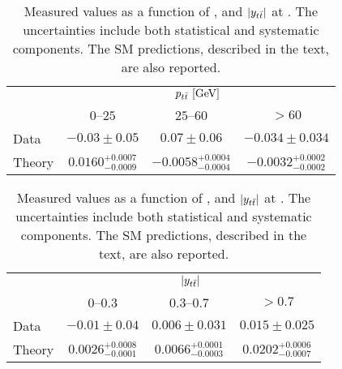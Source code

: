 \begin{table}[!htp]\centering
{}
\begin{tabular}{l c c c }
  &\multicolumn{3}{c}{$p_{t\bar{t}}{}~[\rm{GeV}]$}    \\
  \ac{} &     $0$--$25$           &        $25$--$60$         &  $>60$            \\
  \midrule
  Data  &    $-0.03\pm0.05$       &     $0.07\pm0.06$       &      $-0.034\pm0.034$     \\
  Theory & $0.0160^{+0.0007}_{-0.0009}$ & $-0.0058^{+0.0004}_{-0.0004}$ & $-0.0032^{+0.0002}_{-0.0002}$  \\
  \bottomrule
\end{tabular}
\begin{tabular}{l c c c }
  &\multicolumn{3}{c}{$|y_{t\bar{t}}{}|$}    \\
  \ac{}  &     $0$--$0.3$          &        $0.3$--$0.7$     &  $>0.7$            \\
  \midrule
  Data  &    $-0.01\pm0.04$       &     $0.006\pm0.031$     &      $0.015\pm0.025$     \\
  Theory & $0.0026^{+0.0008}_{-0.0001}$ & $0.0066^{+0.0001}_{-0.0003}$ & $0.0202^{+0.0006}_{-0.0007}$ \\
  \bottomrule
\end{tabular}
\caption{Measured \ac{} values as a function of \mtt{}, \pttt{} and
  $|y_{t\bar{t}}{}|$ at \seventev{}. The uncertainties include both statistical and
  systematic components. The SM predictions, described in the text,
  are also reported.} 
\label{tab:results7tev}
\end{table}
